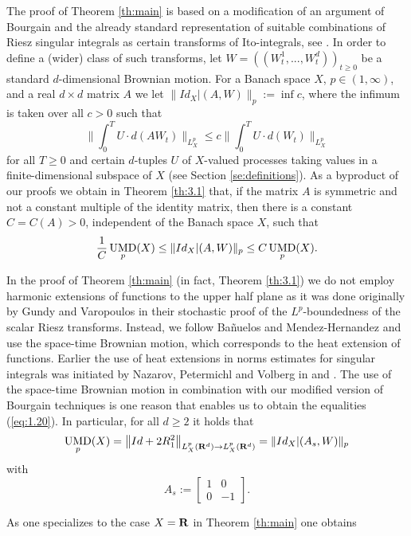 \documentclass[11pt,a4paper,twoside,draft]{amsart}
\theoremstyle{definition}
\newcommand{\beqla}[1] {\begin {eqnarray}\label{#1}}
\def\eeq {\end {eqnarray}}
\newcommand{\real}{{\bf R}}
\newcommand{\BMATRIX}[1]{\begin{bmatrix}#1\end{bmatrix}}
\DeclareMathOperator{\umd}{{\rm UMD}}
\newcommand{\SYM}{{\scriptstyle{\BMATRIX{1&0\\ 0&-1}}}}
\newcommand{\ito}[3]{\| #1 |(#2 ,W)\|_{#3}}
\begin{document}
The proof of Theorem \ref{th:main} is based on a modification of an argument 
of Bourgain and the already standard representation of suitable combinations 
of Riesz singular integrals as certain transforms of Ito-integrals,
see \cite{GunVar,Ban1}. In order to define a (wider) class of such 
transforms, let $W=((W_t^1,...,W_t^d))_{t\ge 0}$ be a standard $d$-dimensional
Brownian motion. For a Banach space $X$, $p\in (1,\infty)$, and a real  
$d\times d$ matrix $A$ we let $\ito{Id_X}{A}{p} := \inf c$, where the infimum 
is taken over all $c>0$ such that
\[     \Big\| \int_0^T U\cdot  d(A W_t)
       \Big \|_{L^p_X}
   \le c  \Big \| \int_0^T U\cdot  d(W_t)
          \Big \|_{L^p_X} \]
for all $T\ge 0$ and  certain $d$-tuples $U$ of $X$-valued processes  
taking values in a finite-dimensional subspace of $X$ 
(see Section \ref{se:definitions}).
As a byproduct of our proofs we obtain in Theorem \ref{th:3.1}
that, if the matrix $A$ is
symmetric and not a constant multiple of the identity matrix,
then there is a constant $C=C(A)>0$, independent of the Banach space $X$,
such that
\beqla{eq:1.30}
     {\frac{1}{C}}\umd_p (X)
\leq \ito{Id_X}{A}{p}
\leq C \umd_p (X).
\eeq

In the proof of Theorem \ref{th:main} (in fact, Theorem \ref{th:3.1})
we do not employ  harmonic extensions of functions 
to the upper half plane as it was done
originally by Gundy and Varopoulos \cite{GunVar} in their stochastic proof of
the $L^p$-boundedness 
of the scalar Riesz transforms. Instead, we follow Ba{\~n}uelos and Mendez-Hernandez
\cite{Ban2} and use the space-time Brownian motion, which corresponds to the heat 
extension of functions. Earlier the use of heat extensions in norms estimates for singular integrals 
was initiated by Nazarov, Petermichl and Volberg in \cite{Petermichel-Volberg} and \cite{Volberg}.
The use of the space-time Brownian motion in combination with our modified version of  Bourgain 
techniques is one reason that enables us to obtain the equalities (\ref{eq:1.20}). In particular, for all $d\geq 2$ it holds that
\begin{equation}\label{eq:1.32}
\umd_p(X) = \left \|  Id+2R_1^2 \right \|_{L^p_X(\real^d )\to L^p_X(\real^d )}
          = \ito{Id_X}{A_s}{p}
\end{equation}
with
\[ A_s := \SYM. \]

As one specializes to the case $X=\real$ in Theorem \ref{th:main} one obtains
\medskip
\end{document}
